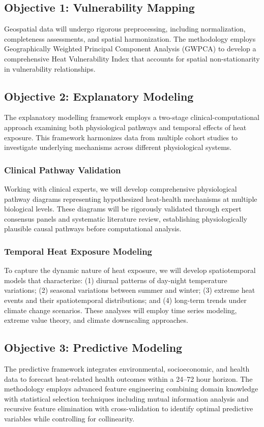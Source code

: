 \subsection{Objective 1: Vulnerability Mapping}
Geospatial data will undergo rigorous preprocessing, including normalization, completeness assessments, and spatial harmonization. The methodology employs Geographically Weighted Principal Component Analysis (GWPCA) \citep{Harris2011, Quispe2023} to develop a comprehensive Heat Vulnerability Index that accounts for spatial non-stationarity in vulnerability relationships.

\subsection{Objective 2: Explanatory Modeling}
The explanatory modelling framework employs a two-stage clinical-computational approach examining both physiological pathways and temporal effects of heat exposure. This framework harmonizes data from multiple cohort studies to investigate underlying mechanisms across different physiological systems.

\subsubsection{Clinical Pathway Validation}
Working with clinical experts, we will develop comprehensive physiological pathway diagrams representing hypothesized heat-health mechanisms at multiple biological levels. These diagrams will be rigorously validated through expert consensus panels and systematic literature review, establishing physiologically plausible causal pathways before computational analysis.

\subsubsection{Temporal Heat Exposure Modeling}
To capture the dynamic nature of heat exposure, we will develop spatiotemporal models that characterize: (1) diurnal patterns of day-night temperature variations; (2) seasonal variations between summer and winter; (3) extreme heat events and their spatiotemporal distributions; and (4) long-term trends under climate change scenarios. These analyses will employ time series modeling, extreme value theory, and climate downscaling approaches.

\subsection{Objective 3: Predictive Modeling}
The predictive framework integrates environmental, socioeconomic, and health data to forecast heat-related health outcomes within a 24--72 hour horizon. The methodology employs advanced feature engineering combining domain knowledge with statistical selection techniques including mutual information analysis and recursive feature elimination with cross-validation to identify optimal predictive variables while controlling for collinearity.


